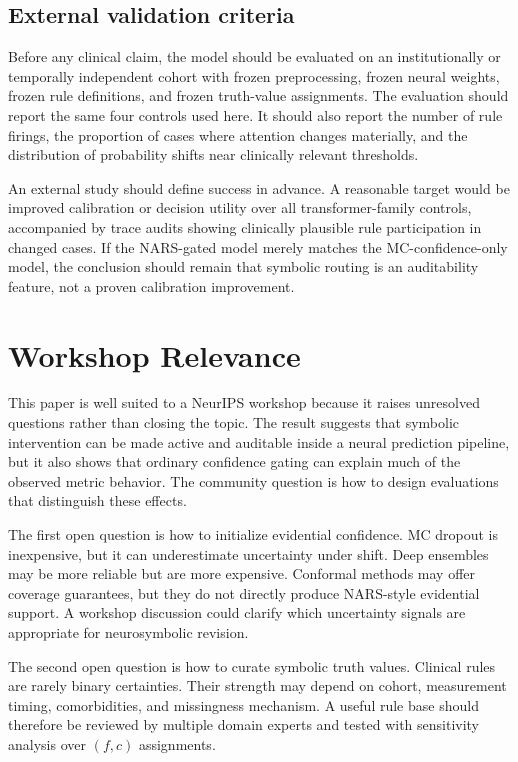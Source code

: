 \documentclass{article}
\begin{document}
\subsection{External validation criteria}

Before any clinical claim, the model should be evaluated on an institutionally or temporally independent cohort with frozen preprocessing, frozen neural weights, frozen rule definitions, and frozen truth-value assignments. The evaluation should report the same four controls used here. It should also report the number of rule firings, the proportion of cases where attention changes materially, and the distribution of probability shifts near clinically relevant thresholds.

An external study should define success in advance. A reasonable target would be improved calibration or decision utility over all transformer-family controls, accompanied by trace audits showing clinically plausible rule participation in changed cases. If the NARS-gated model merely matches the MC-confidence-only model, the conclusion should remain that symbolic routing is an auditability feature, not a proven calibration improvement.

\section{Workshop Relevance}
\label{sec:workshop_relevance}

This paper is well suited to a NeurIPS workshop because it raises unresolved questions rather than closing the topic. The result suggests that symbolic intervention can be made active and auditable inside a neural prediction pipeline, but it also shows that ordinary confidence gating can explain much of the observed metric behavior. The community question is how to design evaluations that distinguish these effects.

The first open question is how to initialize evidential confidence. MC dropout is inexpensive, but it can underestimate uncertainty under shift. Deep ensembles may be more reliable but are more expensive. Conformal methods may offer coverage guarantees, but they do not directly produce NARS-style evidential support. A workshop discussion could clarify which uncertainty signals are appropriate for neurosymbolic revision.

The second open question is how to curate symbolic truth values. Clinical rules are rarely binary certainties. Their strength may depend on cohort, measurement timing, comorbidities, and missingness mechanism. A useful rule base should therefore be reviewed by multiple domain experts and tested with sensitivity analysis over $(f,c)$ assignments.
\end{document}
